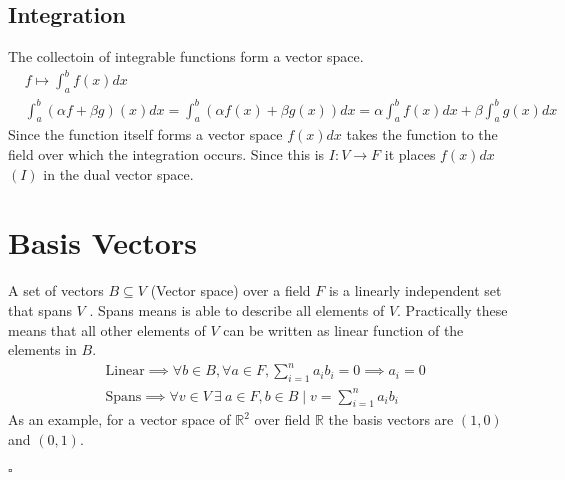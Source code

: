 \documentclass[a4paper]{article}
\begin{document}
\subsection{Integration \cite{wiki:integration}}
The collectoin of integrable functions form a vector space.
\begin{align}
  &f \mapsto \int_a^b f(x) dx\\
  &\int_a^b (\alpha f + \beta g)(x) dx = \int_a^b (\alpha f(x)+\beta g(x)) dx=\alpha \int_a^b f(x)dx + \beta \int_a^b g(x)dx
\end{align}
Since the function itself forms a vector space $f(x) dx$ takes the function to the field over which the integration occurs. Since this is $I:V \to F$ it places $f(x)dx$ $(I)$ in the dual vector space.
\section {Basis Vectors}
A set of vectors $B \subseteq V$ (Vector space) over a field $F$ is a linearly independent set that spans $V$ \cite{wiki:basis}. Spans means is able to describe all elements of $V$. Practically these means that all other elements of $V$ can be written as linear function of the elements in $B$.
\begin{align}
  &\text{Linear}\implies \forall b \in B, \forall a \in F, \sum_{i=1}^n a_i b_i =0 \implies a_i = 0\\
  &\text{Spans}\implies \forall v \in V \: \exists \: a \in F, b \in B \mid v = \sum_{i=1}^n a_i b_i
\end{align}
As an example, for a vector space of $\mathbb{R}^2$ over field $\mathbb{R}$ the basis vectors are $(1,0)$ and $(0,1)$.
\\ \\
$\square$


\end{document}
